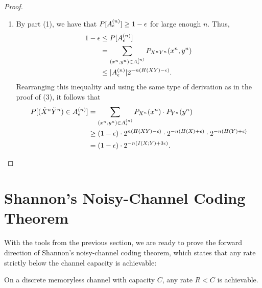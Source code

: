 \begin{proof}
\begin{enumerate}
\begin{align}
\end{align}
Combining this with part (2) of this theorem, we get
\begin{align}
P[(\tilde{X}^n\tilde{Y}^n) \in \typset] &\leq 2^{n(H(XY) + \epsilon)} \cdot 2^{-n(H(X) - \epsilon)} \cdot 2^{-n(H(Y)-\epsilon)}\nonumber\\
&= 2^{-n(-H(XY) + H(X) + H(Y) -3\epsilon)}\nonumber\\
&= 2^{-n(I(X;Y) - 3\epsilon)}.
\end{align}
This completes the proof of the third part.
\item By part (1), we have that $P[A_{\epsilon}^{(n)}] \geq 1 - \epsilon$ for large enough $n$. Thus,
\begin{align}
1-\epsilon &\leq P[A_{\epsilon}^{(n)}]\nonumber\\
&= \sum_{(x^n,y^n) \in A_{\epsilon}^{(n)}} P_{X^nY^n}(x^n,y^n)\nonumber\\
&\leq |A_{\epsilon}^{(n)}| 2^{-n(H(XY) - \epsilon)}.
\end{align}
Rearranging this inequality and using the same type of derivation as in the proof of (3), it follows that
\begin{align}
P[(\tilde{X}^n\tilde{Y}^n) \in A_{\epsilon}^{(n)}]
&= \sum_{(x^n,y^n) \in A_{\epsilon}^{(n)}} P_{X^n}(x^n) \cdot P_{Y^n}(y^n)\nonumber\\
&\geq (1-\epsilon) \cdot 2^{n(H(XY) - \epsilon)} \cdot 2^{-n(H(X) + \epsilon)} \cdot 2^{-n(H(Y) + \epsilon)}\nonumber\\
&= (1 - \epsilon) \cdot 2^{-n(I(X;Y) + 3\epsilon)}.
\end{align}
\end{enumerate}
\end{proof}

\section{Shannon's Noisy-Channel Coding Theorem}
With the tools from the previous section, we are ready to prove the forward direction of Shannon's noisy-channel coding theorem, which states that any rate strictly below the channel capacity is achievable:

\begin{theorem}\label{thm:ncc-forward}
On a discrete memoryless channel with capacity $C$, any rate $R < C$ is achievable.
\end{theorem}


